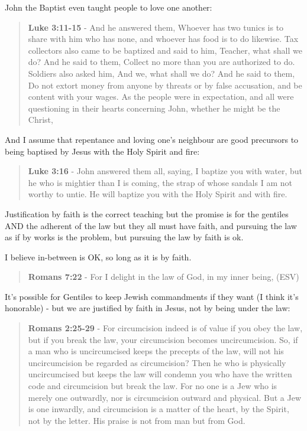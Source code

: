 \documentclass[11pt]{article}
\begin{document}
John the Baptist even taught people to love one another:

\begin{quote}
\textbf{Luke 3:11-15} - And he answered them, Whoever has two tunics is to share with him who has none, and whoever has food is to do likewise. Tax collectors also came to be baptized and said to him, Teacher, what shall we do? And he said to them, Collect no more than you are authorized to do. Soldiers also asked him, And we, what shall we do? And he said to them, Do not extort money from anyone by threats or by false accusation, and be content with your wages. As the people were in expectation, and all were questioning in their hearts concerning John, whether he might be the Christ,
\end{quote}

And I assume that repentance and loving one's neighbour are good precursors to being baptised by Jesus with the Holy Spirit and fire:

\begin{quote}
\textbf{Luke 3:16} - John answered them all, saying, I baptize you with water, but he who is mightier than I is coming, the strap of whose sandals I am not worthy to untie. He will baptize you with the Holy Spirit and with fire.
\end{quote}

Justification by faith is the correct teaching but the promise is for the gentiles AND the adherent of the law but they all must have faith, and pursuing the law as if by works is the problem, but pursuing the law by faith is ok.

I believe in-between is OK, so long as it is by faith.

\begin{quote}
\textbf{Romans 7:22} - For I delight in the law of God, in my inner being, (ESV)
\end{quote}

It's possible for Gentiles to keep Jewish commandments if they want (I think it's honorable) - but we are justified by faith in Jesus, not by being under the law:

\begin{quote}
\textbf{Romans 2:25-29} - For circumcision indeed is of value if you obey the law, but if you break the law, your circumcision becomes uncircumcision. So, if a man who is uncircumcised keeps the precepts of the law, will not his uncircumcision be regarded as circumcision? Then he who is physically uncircumcised but keeps the law will condemn you who have the written code and circumcision but break the law. For no one is a Jew who is merely one outwardly, nor is circumcision outward and physical. But a Jew is one inwardly, and circumcision is a matter of the heart, by the Spirit, not by the letter. His praise is not from man but from God.
\end{quote}
\end{document}
